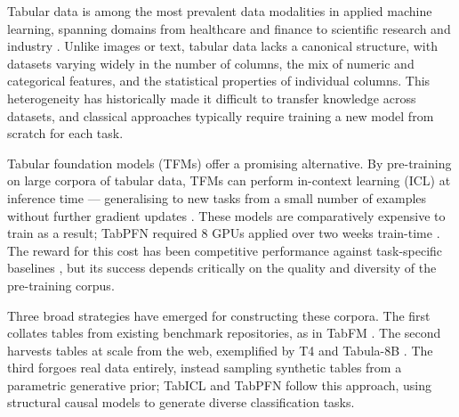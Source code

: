 \documentclass{article}
\begin{document}
Tabular data is among the most prevalent data modalities in applied machine learning, spanning domains from healthcare and finance to scientific research and industry \cite{akoglu_rtm_2008, jiangRepresentationLearningTabular2026, shwartz-zivTabularDataDeep2022, quinnLiteratureReviewExplainable2024}. Unlike images or text, tabular data lacks a canonical structure, with datasets varying widely in the number of columns, the mix of numeric and categorical features, and the statistical properties of individual columns. This heterogeneity has historically made it difficult to transfer knowledge across datasets, and classical approaches typically require training a new model from scratch for each task.

Tabular foundation models (TFMs) offer a promising alternative. By pre-training on large corpora of tabular data, TFMs can perform in-context learning (ICL) at inference time --- generalising to new tasks from a small number of examples without further gradient updates \cite{hollmannAccuratePredictionsSmall2025, quTabICLTabularFoundation2025, wenSupervisedGenerativeNovel2024, zhangMitraMixedSynthetic2025}. 
These models are comparatively expensive to train as a result; TabPFN required 8 GPUs applied over two weeks train-time \cite{hollmannAccuratePredictionsSmall2025}.
The reward for this cost has been competitive performance against task-specific baselines \cite{hollmannAccuratePredictionsSmall2025,zhangMitraMixedSynthetic2025}, but its success depends critically on the quality and diversity of the pre-training corpus.

Three broad strategies have emerged for constructing these corpora. The first collates tables from existing benchmark repositories, as in TabFM \cite{wenSupervisedGenerativeNovel2024}. The second harvests tables at scale from the web, exemplified by T4 and Tabula-8B \cite{gardnerLargeScaleTransfer2024a}. The third forgoes real data entirely, instead sampling synthetic tables from a parametric generative prior; TabICL \cite{quTabICLTabularFoundation2025} and TabPFN \cite{hollmannAccuratePredictionsSmall2025} follow this approach, using structural causal models to generate diverse classification tasks.


\end{document}
